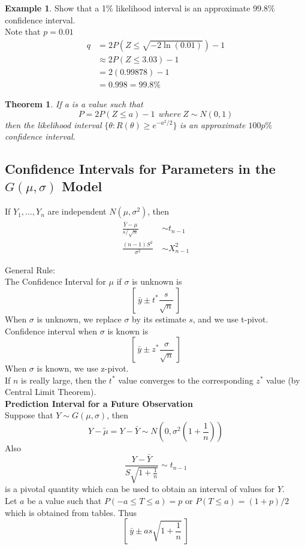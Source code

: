 \documentclass[12pt, leqno]{article}
\theoremstyle{definition}
\newtheorem*{theorem}{Theorem}
\newtheorem{ex}{Example}[section]
\begin{document}
  \begin{ex}
    Show that a 1\% likelihood interval is an approximate 99.8\% confidence interval. \\
    Note that $p = 0.01$
    \begin{align*}
      q &= 2P(Z \leq \sqrt{-2\ln(0.01)}) - 1 \\
        &\approx 2P(Z \leq 3.03) - 1 \\
        &= 2(0.99878) - 1 \\
        &= 0.998 = 99.8\%
    \end{align*}
  \end{ex}

  \begin{theorem}
    \emph{If a is a value such that}
    $$P = 2P(Z \leq a) - 1 ~~ where ~ Z \sim N(0,1)$$
    \emph{then the likelihood interval }$\{\theta : R(\theta) \geq e^{-a^{2}/2}\}$ \emph{is an approximate $100p\%$ confidence interval.}
  \end{theorem}

  \subsection{Confidence Intervals for Parameters in the $G(\mu, \sigma)$ Model}
  If $Y_{1}, \dots, Y_{n}$ are independent $N(\mu, \sigma^{2})$, then
  \begin{align}
     \frac{\bar{Y} - \mu}{s / \sqrt{n}}~ &\sim t_{n-1} \\
     \frac{(n-1)S^{2}}{\sigma^{2}} ~&\sim X_{n-1}^{2}
  \end{align}

  General Rule: \\
  The Confidence Interval for $\mu$ if $\sigma$ is unknown is
  $$\left[~\bar{y} \pm t^{*}\frac{s}{\sqrt{n}}~\right]$$
  When $\sigma$ is unknown, we replace $\sigma$ by its estimate $s$, and we use t-pivot. \\
  Confidence interval when $\sigma$ is known is
  $$\left[~\bar{y} \pm z^{*}\frac{\sigma}{\sqrt{n}}~\right]$$
  When $\sigma$ is known, we use z-pivot. \\

  If $n$ is really large, then the $t^{*}$ value converges to the corresponding $z^{*}$ value (by Central Limit Theorem). \\

  \textbf{Prediction Interval for a Future Observation} \\
  Suppose that $Y \sim G(\mu,\sigma)$, then
  $$Y - \widetilde{\mu} = Y - \bar{Y} \sim N\left(0, \sigma^{2}\left(1 + \frac{1}{n}\right)\right)$$
  Also
  $$\frac{Y - \bar{Y}}{S\sqrt{1 + \frac{1}{n}}} \sim t_{n-1}$$
  is a pivotal quantity which can be used to obtain an interval of values for $Y$. \\
  Let $a$ be a value such that $P(-a \leq T \leq a) = p$ or $P(T \leq a) = (1+p)/2$ which is obtained from tables. Thus
  $$\left[ ~\bar{y} \pm as\sqrt{1 + \frac{1}{n}} ~\right]$$
\end{document}

